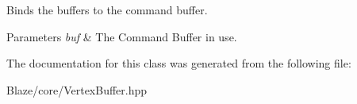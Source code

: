 Binds the buffers to the command buffer. 


\begin{DoxyParams}{Parameters}
{\em buf} & The Command Buffer in use. \\
\hline
\end{DoxyParams}


The documentation for this class was generated from the following file\+:\begin{DoxyCompactItemize}
\item 
Blaze/core/Vertex\+Buffer.\+hpp\end{DoxyCompactItemize}
